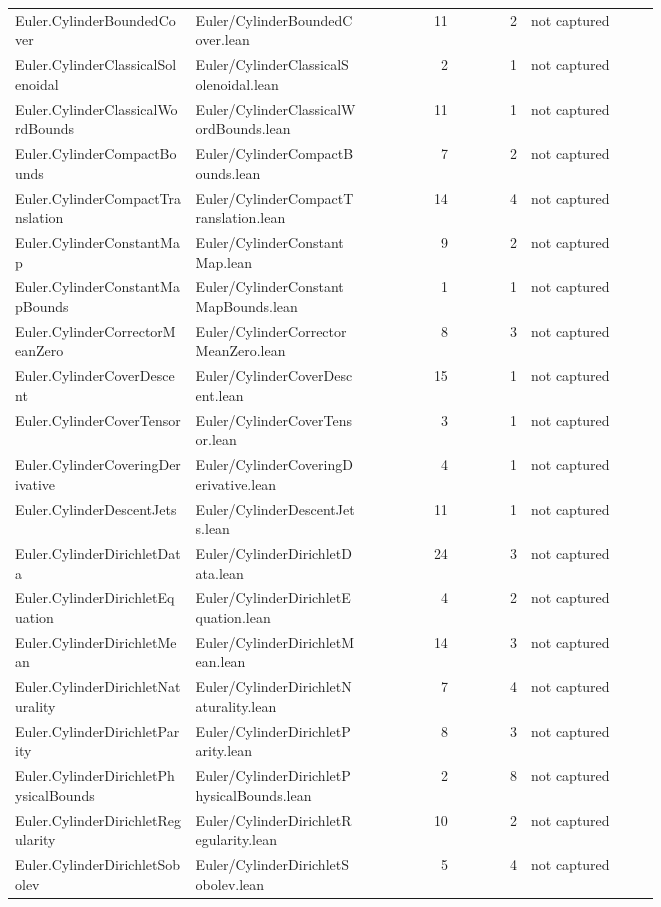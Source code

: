\documentclass[10pt]{article}
\begin{document}
\begin{longtable}{p{0.28\linewidth}p{0.27\linewidth}r r p{0.20\linewidth}}
Euler.CylinderBoundedCover & Euler/CylinderBoundedCover.lean & 11 & 2 & not captured\\
Euler.CylinderClassicalSolenoidal & Euler/CylinderClassicalSolenoidal.lean & 2 & 1 & not captured\\
Euler.CylinderClassicalWordBounds & Euler/CylinderClassicalWordBounds.lean & 11 & 1 & not captured\\
Euler.CylinderCompactBounds & Euler/CylinderCompactBounds.lean & 7 & 2 & not captured\\
Euler.CylinderCompactTranslation & Euler/CylinderCompactTranslation.lean & 14 & 4 & not captured\\
Euler.CylinderConstantMap & Euler/CylinderConstantMap.lean & 9 & 2 & not captured\\
Euler.CylinderConstantMapBounds & Euler/CylinderConstantMapBounds.lean & 1 & 1 & not captured\\
Euler.CylinderCorrectorMeanZero & Euler/CylinderCorrectorMeanZero.lean & 8 & 3 & not captured\\
Euler.CylinderCoverDescent & Euler/CylinderCoverDescent.lean & 15 & 1 & not captured\\
Euler.CylinderCoverTensor & Euler/CylinderCoverTensor.lean & 3 & 1 & not captured\\
Euler.CylinderCoveringDerivative & Euler/CylinderCoveringDerivative.lean & 4 & 1 & not captured\\
Euler.CylinderDescentJets & Euler/CylinderDescentJets.lean & 11 & 1 & not captured\\
Euler.CylinderDirichletData & Euler/CylinderDirichletData.lean & 24 & 3 & not captured\\
Euler.CylinderDirichletEquation & Euler/CylinderDirichletEquation.lean & 4 & 2 & not captured\\
Euler.CylinderDirichletMean & Euler/CylinderDirichletMean.lean & 14 & 3 & not captured\\
Euler.CylinderDirichletNaturality & Euler/CylinderDirichletNaturality.lean & 7 & 4 & not captured\\
Euler.CylinderDirichletParity & Euler/CylinderDirichletParity.lean & 8 & 3 & not captured\\
Euler.CylinderDirichletPhysicalBounds & Euler/CylinderDirichletPhysicalBounds.lean & 2 & 8 & not captured\\
Euler.CylinderDirichletRegularity & Euler/CylinderDirichletRegularity.lean & 10 & 2 & not captured\\
Euler.CylinderDirichletSobolev & Euler/CylinderDirichletSobolev.lean & 5 & 4 & not captured\\

\end{longtable}
\end{document}
